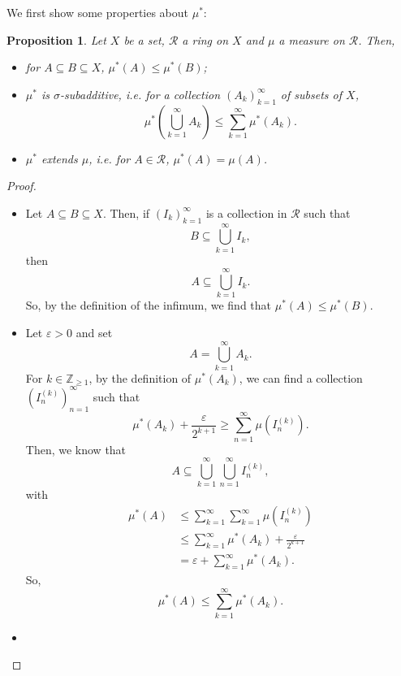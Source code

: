 \documentclass[a4paper, openany]{memoir}
\theoremstyle{definition}
\theoremstyle{plain}
\newtheorem{proposition}[definition]{Proposition}
\begin{document}
    We first show some properties about $\mu^*$:
    \begin{proposition}
        Let $X$ be a set, $\mathcal{R}$ a ring on $X$ and $\mu$ a measure on $\mathcal{R}$. Then,
        \begin{itemize}
            \item for $A \subseteq B \subseteq X$, $\mu^*(A) \leq \mu^*(B)$;
            \item $\mu^*$ is $\sigma$-subadditive, i.e. for a collection $(A_k)_{k=1}^\infty$ of subsets of $X$,
            \[\mu^*\left(\bigcup_{k=1}^\infty A_k\right) \leq \sum_{k=1}^\infty \mu^*(A_k).\]
            \item $\mu^*$ extends $\mu$, i.e. for $A \in \mathcal{R}$, $\mu^*(A) = \mu(A)$.
        \end{itemize}
    \end{proposition}
    \begin{proof}
        \hspace*{0pt}
         \begin{itemize}
            \item Let $A \subseteq B \subseteq X$. Then, if $(I_k)_{k=1}^\infty$ is a collection in $\mathcal{R}$ such that 
            \[B \subseteq \bigcup_{k=1}^\infty I_k,\]
            then 
            \[A \subseteq \bigcup_{k=1}^\infty I_k.\]
            So, by the definition of the infimum, we find that $\mu^*(A) \leq \mu^*(B)$.

            \item Let $\varepsilon > 0$ and set
            \[A = \bigcup_{k=1}^\infty A_k.\]
            For $k \in \mathbb{Z}_{\geq 1}$, by the definition of $\mu^*(A_k)$, we can find a collection $(I^{(k)}_n)_{n=1}^\infty$ such that
            \[\mu^*(A_k) + \frac{\varepsilon}{2^{k+1}} \geq \sum_{n=1}^\infty \mu(I^{(k)}_n).\]
            Then, we know that
            \[A \subseteq \bigcup_{k=1}^\infty \bigcup_{n=1}^\infty I^{(k)}_n,\]
            with
            \begin{align*}
                \mu^*(A) &\leq \sum_{k=1}^\infty \sum_{k=1}^\infty \mu(I^{(k)}_n) \\
                &\leq \sum_{k=1}^\infty \mu^*(A_k) + \frac{\varepsilon}{2^{k+1}} \\
                &= \varepsilon + \sum_{k=1}^\infty \mu^*(A_k).
            \end{align*}
            So,
            \[\mu^*(A) \leq \sum_{k=1}^\infty \mu^*(A_k).\]
            
            \item 
         \end{itemize}
    \end{proof}
\end{document}
